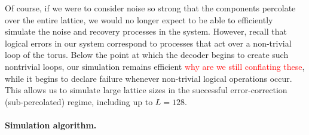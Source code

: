 \documentclass[aps, prl, letterpaper, twocolumn, superscriptaddress, notitlepage, 10pt]{revtex4}
\newcommand{\cggb}[1]{\textcolor{blue}{#1}}
\newcommand{\dude}[1]{\textcolor{red}{#1}}
\begin{document}
Of course, if we were to consider noise so strong that 
the components percolate over the entire lattice, we would no 
longer expect to be able to efficiently simulate the noise and recovery processes in the system. 
However, recall that logical errors in our system correspond to 
processes that act over a non-trivial loop of the torus. 
Below the point at which the decoder begins to create 
such nontrivial loops, our simulation remains efficient \dude{why are we still conflating these},
while it begins to declare failure whenever non-trivial logical 
operations occur. This allows us to simulate large lattice sizes 
in the successful error-correction (sub-percolated) regime, including up to $L=128$.

\paragraph{Simulation algorithm.}


\end{document}
